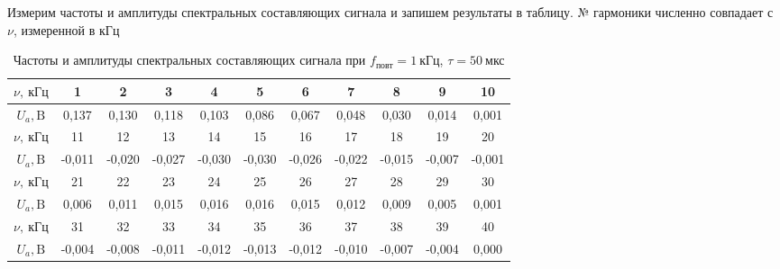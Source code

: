Измерим частоты и амплитуды спектральных
составляющих сигнала и запишем
результаты в таблицу. № гармоники
численно совпадает с $\nu$, измеренной в
$\text{кГц}$
\renewcommand{\arraystretch}{1.1} 
\renewcommand{\tabcolsep}{1.4mm} 
\begin{table}[H]
\centering
\begin{tabular}{|c|c|c|c|c|c|c|c|c|c|c|}
\hline
$\nu, \ \text{кГц}$ & 1      & 2      & 3      & 4      & 5      & 6      & 7      & 8      & 9      & 10     \\ \hline
$U_a, \text{B}$ & 0,137  & 0,130  &
0,118  & 0,103  & 0,086  & 0,067  &
0,048  & 0,030  & 0,014  & 0,001  \\
\hline \hline
$\nu, \ \text{кГц}$ & 11     & 12     & 13     & 14     & 15     & 16     & 17     & 18     & 19     & 20     \\ \hline
$U_a, \text{B}$ & -0,011 & -0,020 &
-0,027 & -0,030 & -0,030 & -0,026 &
-0,022 & -0,015 & -0,007 & -0,001 \\
\hline \hline
$\nu, \ \text{кГц}$ & 21     & 22     & 23     & 24     & 25     & 26     & 27     & 28     & 29     & 30     \\ \hline
$U_a, \text{B}$ & 0,006  & 0,011  &
0,015  & 0,016  & 0,016  & 0,015  &
0,012  & 0,009  & 0,005  & 0,001  \\
\hline \hline
$\nu, \ \text{кГц}$ & 31     & 32     & 33     & 34     & 35     & 36     & 37     & 38     & 39     & 40     \\ \hline
$U_a, \text{B}$ & -0,004 & -0,008 & -0,011 & -0,012 & -0,013 & -0,012 & -0,010 & -0,007 & -0,004 & 0,000  \\ \hline
\end{tabular}
\captionsetup{justification=centering}
\caption{Частоты и амплитуды
спектральных составляющих сигнала при
$f_\text{повт} = 1 \ \text{кГц}$, $\tau
= 50 \ \text{мкс}$}
\end{table}

